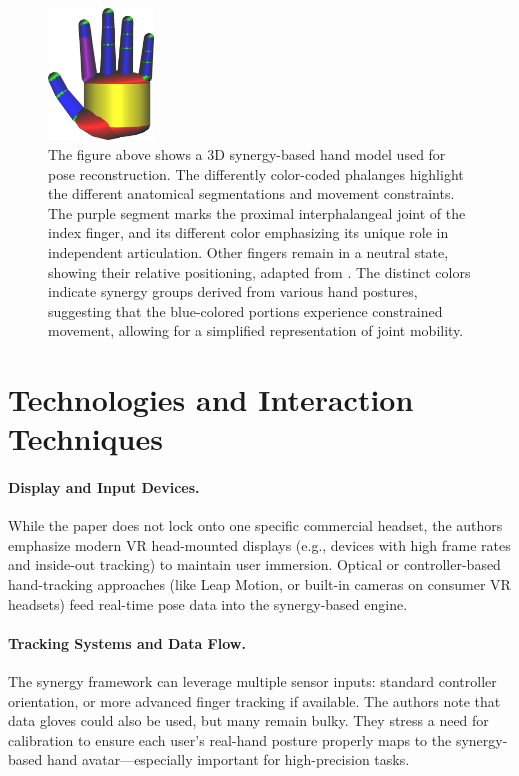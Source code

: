 \documentclass[11pt]{llncs}
\begin{document}
\begin{figure}[H]
\centering
\includegraphics[width=0.25\textwidth]{synergy-based_hand_model.png}
\caption{The figure above shows a 3D synergy-based hand model used for pose reconstruction. The differently color-coded phalanges highlight the different anatomical segmentations and movement constraints. The purple segment marks the proximal interphalangeal joint of the index finger, and its different color emphasizing its unique role in independent articulation. Other fingers remain in a neutral state, showing their relative positioning, adapted from \cite{Ciotti2016}. The distinct colors indicate synergy groups derived from various hand postures, suggesting that the blue-colored portions experience constrained movement, allowing for a simplified representation of joint mobility.}
\label{fig:synergy-model}
\end{figure}

\section*{Technologies and Interaction Techniques}
\paragraph{Display and Input Devices.}
While the paper does not lock onto one specific commercial headset, the authors emphasize modern VR head-mounted displays (e.g., devices with high frame rates and inside-out tracking) to maintain user immersion. Optical or controller-based hand-tracking approaches (like Leap Motion, or built-in cameras on consumer VR headsets) feed real-time pose data into the synergy-based engine.

\paragraph{Tracking Systems and Data Flow.}
The synergy framework can leverage multiple sensor inputs: standard controller orientation, or more advanced finger tracking if available. The authors note that data gloves could also be used, but many remain bulky. They stress a need for calibration to ensure each user's real-hand posture properly maps to the synergy-based hand avatar—especially important for high-precision tasks.
\end{document}
